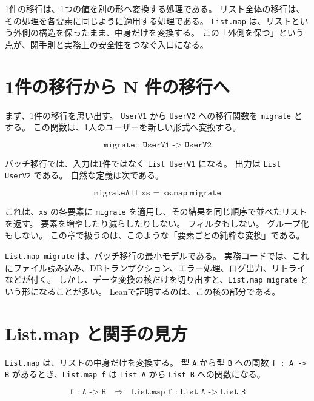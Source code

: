 \begin{intuitionbox}
1件の移行は、1つの値を別の形へ変換する処理である。
リスト全体の移行は、その処理を各要素に同じように適用する処理である。
\texttt{List.map} は、リストという外側の構造を保ったまま、中身だけを変換する。
この「外側を保つ」という点が、関手則と実務上の安全性をつなぐ入口になる。
\end{intuitionbox}


\section{1件の移行から N 件の移行へ}

まず、1件の移行を思い出す。
\texttt{UserV1} から \texttt{UserV2} への移行関数を \texttt{migrate} とする。
この関数は、1人のユーザーを新しい形式へ変換する。

\[
  \texttt{migrate : UserV1 -> UserV2}
\]

バッチ移行では、入力は1件ではなく \texttt{List UserV1} になる。
出力は \texttt{List UserV2} である。
自然な定義は次である。

\[
  \texttt{migrateAll xs = xs.map migrate}
\]

これは、\texttt{xs} の各要素に \texttt{migrate} を適用し、その結果を同じ順序で並べたリストを返す。
要素を増やしたり減らしたりしない。
フィルタもしない。
グループ化もしない。
この章で扱うのは、このような「要素ごとの純粋な変換」である。

\begin{softwarebox}
\texttt{List.map migrate} は、バッチ移行の最小モデルである。
実務コードでは、これにファイル読み込み、DBトランザクション、エラー処理、ログ出力、リトライなどが付く。
しかし、データ変換の核だけを切り出すと、\texttt{List.map migrate} という形になることが多い。
Leanで証明するのは、この核の部分である。
\end{softwarebox}

\section{List.map と関手の見方}

\texttt{List.map} は、リストの中身だけを変換する。
型 \texttt{A} から型 \texttt{B} への関数 \texttt{f : A -> B} があるとき、\texttt{List.map f} は \texttt{List A} から \texttt{List B} への関数になる。

\[
  \texttt{f : A -> B}
  \quad\Longrightarrow\quad
  \texttt{List.map f : List A -> List B}
\]

